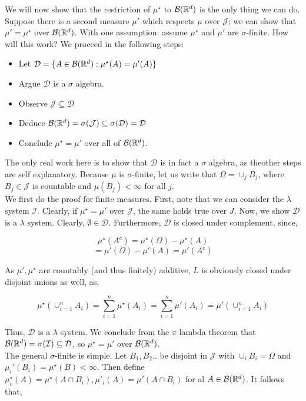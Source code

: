 We will now show that the restriction of $\mu^\star$ to $\mathcal B(\mathbb R^d)$ is the only thing we can do. 
Suppose there is a second measure $\mu'$ which respects $\mu$ over $\mathcal J$; we can show that 
$\mu' = \mu^\star$ over $\mathcal B(\mathbb R^d)$. With one assumption: assume 
$\mu^\star$ and $\mu'$ are $\sigma$-finite. How will this work? We proceed in the following steps: 
\begin{itemize}
   \item Let $\mathcal D = \{A \in \mathcal B(\mathbb R^d) : \mu^\star(A) = \mu'(A)\}$
   \item Argue $\mathcal D$ is a $\sigma$ algebra.
   \item Observe $\mathcal J \subseteq \mathcal D$
   \item Deduce $\mathcal B(\mathbb R^d) = \sigma(\mathcal J) \subseteq \sigma(\mathcal D) = \mathcal D$
   \item Conclude $\mu^\star = \mu'$ over all of $\mathcal B(\mathbb R^d)$.
\end{itemize}

The only real work here is to show that $\mathcal D$ is in fact a 
$\sigma$ algebra, as theother steps are self explanatory. Because 
$\mu$ is $\sigma$-finite, let us write that $\Omega = \cup_j B_j$, where 
$B_j \in \mathcal J$ is countable and $\mu(B_j)< \infty$ for all $j$.\\

We first do the proof for finite measures. First, note that we can consider the 
$\lambda$ system $\mathcal I$. Clearly, if $\mu^\star = \mu'$ over $\mathcal J$, the same 
holds true over $J$. Now, we show $\mathcal D$ is a $\lambda$ system. Clearly, 
$\emptyset \in \mathcal D$. Furthermore, $\mathcal D$ is closed under complement, since, 

\[ \mu^\star(A^c) = \mu^\star(\Omega) - \mu^\star(A) \]
\[ = \mu'(\Omega) - \mu'(A) = \mu'(A^c) \] 

As $\mu', \mu^\star$ are countably (and thus finitely) additive, $L$ is obviously 
closed under disjoint unions as well, as, 

\[ \mu^\star(\cup_{i=1}^n A_i) = \sum_{i=1}^n \mu^\star(A_i) = \sum_{i=1}^n \mu'(A_i) = \mu'(\cup_{i=1}^n A_i) \]

Thus, $\mathcal D$ is a $\lambda$ system. We conclude from the 
$\pi$ lambda theorem that $\mathcal B(\mathbb R^d) = \sigma(\mathcal I) \subseteq \mathcal D$, so 
$\mu^\star = \mu'$ over $\mathcal B(\mathbb R^d)$. \\ 

The general $\sigma$-finite is simple. Let $B_1,B_2..$ be disjoint in $\mathcal J$ with 
$\cup_i B_i = \Omega$ and $\mu_i'(B_i) = \mu^\star(B) < \infty$. Then define $\mu^\star_i(A) = \mu^\star(A \cap B_i), 
\mu'_i(A) = \mu'(A \cap B_i)$ for al $A \in \mathcal B(\mathbb R^d)$. It follows that, 

